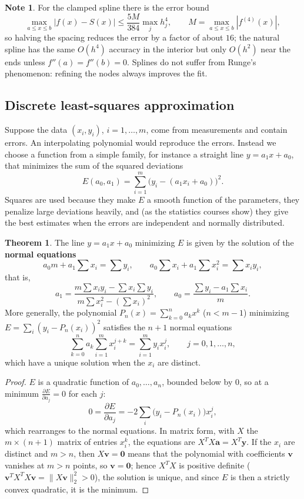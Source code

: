 \documentclass[11pt,a4paper]{article}
\numberwithin{equation}{section}
\theoremstyle{definition}
\newtheorem{thm}{Theorem}[subsection]
\newtheorem*{note}{Note}
\begin{document}
\begin{note}
For the clamped spline there is the error bound
$$\max_{a\leq x\leq b}|f(x)-S(x)|\leq\frac{5M}{384}\max_jh_j^4,\qquad M = \max_{a\leq x\leq b}|f^{(4)}(x)|,$$
so halving the spacing reduces the error by a factor of about $16$; the natural spline has the same $O(h^4)$ accuracy in the interior but
only $O(h^2)$ near the ends unless $f''(a) = f''(b) = 0$. Splines do not suffer from Runge's phenomenon: refining the nodes always improves
the fit.
\end{note}


\subsection{Discrete least-squares approximation}
\label{sec:leastsq}

Suppose the data $(x_i,y_i)$, $i = 1,\dots,m$, come from measurements and contain errors. An interpolating polynomial would reproduce the
errors. Instead we choose a function from a simple family, for instance a straight line $y = a_1x+a_0$, that minimizes the sum of the
squared deviations
$$E(a_0,a_1) = \sum_{i=1}^m\bigl(y_i-(a_1x_i+a_0)\bigr)^2 .$$
Squares are used because they make $E$ a smooth function of the parameters, they penalize large deviations heavily, and (as the
statistics courses show) they give the best estimates when the errors are independent and normally distributed.

\begin{thm}
\label{thm:normaleq}
The line $y = a_1x+a_0$ minimizing $E$ is given by the solution of the \textbf{normal equations}
$$a_0m+a_1\sum x_i = \sum y_i,\qquad a_0\sum x_i+a_1\sum x_i^2 = \sum x_iy_i ,$$
that is,
$$a_1 = \frac{m\sum x_iy_i-\sum x_i\sum y_i}{m\sum x_i^2-\left(\sum x_i\right)^2},\qquad a_0 = \frac{\sum y_i-a_1\sum x_i}{m} .$$
More generally, the polynomial $P_n(x) = \sum_{k=0}^na_kx^k$ ($n<m-1$) minimizing $E = \sum_i(y_i-P_n(x_i))^2$ satisfies the $n+1$ normal
equations
$$\sum_{k=0}^na_k\sum_{i=1}^mx_i^{j+k} = \sum_{i=1}^my_ix_i^j,\qquad j = 0,1,\dots,n,$$
which have a unique solution when the $x_i$ are distinct.
\end{thm}

\begin{proof}
$E$ is a quadratic function of $a_0,\dots,a_n$, bounded below by $0$, so at a minimum $\frac{\partial E}{\partial a_j} = 0$ for each $j$:
$$0 = \frac{\partial E}{\partial a_j} = -2\sum_i\bigl(y_i-P_n(x_i)\bigr)x_i^j ,$$
which rearranges to the normal equations. In matrix form, with $X$ the $m\times(n+1)$ matrix of entries $x_i^k$, the equations are
$X^TX\mathbf a = X^T\mathbf y$. If the $x_i$ are distinct and $m>n$, then $X\mathbf v = \mathbf 0$ means that the polynomial with coefficients $\mathbf v$
vanishes at $m>n$ points, so $\mathbf v = \mathbf 0$; hence $X^TX$ is positive definite ($\mathbf v^TX^TX\mathbf v = \|X\mathbf v\|_2^2>0$), the solution is
unique, and since $E$ is then a strictly convex quadratic, it is the minimum.
\end{proof}
\end{document}
